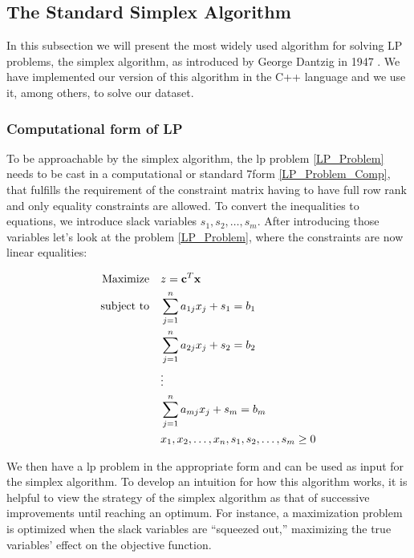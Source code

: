 \subsection{The Standard Simplex Algorithm}
In this subsection we will present the most widely used algorithm for solving
LP problems, the simplex algorithm, as introduced by George Dantzig in 1947
\parencite{dantzig1990origins}. We have implemented our version of this algorithm
in the C++ language and we use it, among others, to solve our dataset.

\subsubsection{Computational form of LP}
To be approachable by the simplex algorithm, the \gls{lp} problem
\ref{LP_Problem} needs to be cast in a
computational or standard 7form \ref{LP_Problem_Comp}, that fulfills the requirement of the
constraint matrix having to have full row rank and only equality  constraints are allowed.
To convert the inequalities to equations, we introduce slack variables
\(s_1, s_2, \dots, s_m\). After introducing those variables
let's look at the problem \ref{LP_Problem}, where the constraints are now linear equalities:

\begin{align}
    \text{Maximize} \quad   & z = \mathbf{c}^T \mathbf{x} \notag                            \\
    \text{subject to} \quad & \sum_{j=1}^{n} a_{1j} x_j + s_1 = b_1 \notag                  \\
                            & \sum_{j=1}^{n} a_{2j} x_j + s_2 = b_2 \notag                  \\
                            & \vdots \notag                                                 \\
                            & \sum_{j=1}^{n} a_{mj} x_j + s_m = b_m \label{LP_Problem_Comp} \\
                            & x_1, x_2, \dots, x_n, s_1, s_2, \dots, s_m \geq 0 \notag
\end{align}

We then have a \gls{lp} problem in the appropriate form and can be used as input for
the simplex algorithm. To develop an intuition for how this algorithm works,
it is helpful to view the strategy of the simplex algorithm as that of
successive improvements until reaching an optimum. For instance, a maximization problem is optimized when the slack
variables are “squeezed out,” maximizing the true variables’ effect on the objective
function.

